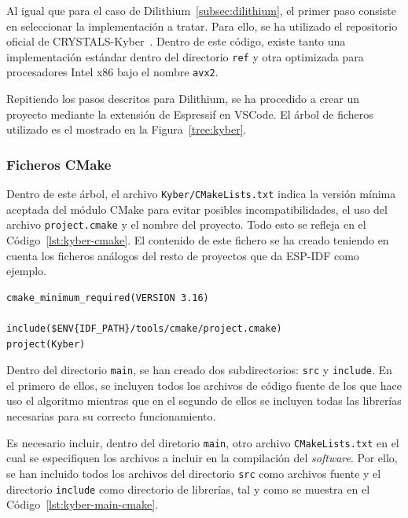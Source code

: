 Al igual que para el caso de Dilithium~\ref{subsec:dilithium}, el primer paso consiste en seleccionar la implementación a tratar.
Para ello, se ha utilizado el repositorio oficial de CRYSTALS-Kyber~\cite{github-kyber}.
Dentro de este código, existe tanto una implementación estándar dentro del directorio \texttt{ref} y otra optimizada para procesadores Intel x86 bajo el nombre \texttt{avx2}.

Repitiendo los pasos descritos para Dilithium, se ha procedido a crear un proyecto mediante la extensión de Espressif en VSCode.
El árbol de ficheros utilizado es el mostrado en la Figura~\ref{tree:kyber}.

\subsubsection{Ficheros CMake}\label{subsubsec:kyber-cmake}

Dentro de este árbol, el archivo \texttt{Kyber/CMakeLists.txt} indica la versión mínima aceptada del módulo CMake para evitar posibles incompatibilidades, el uso del archivo \texttt{project.cmake} y el nombre del proyecto.
Todo esto se refleja en el Código~\ref{lst:kyber-cmake}.
El contenido de este fichero se ha creado teniendo en cuenta los ficheros análogos del resto de proyectos que da ESP-IDF como ejemplo.

\begin{lstlisting}[label={lst:kyber-cmake},style=Bashnice,firstnumber=1,caption={Archivo \texttt{Kyber/CMakeLists.txt}.}]
cmake_minimum_required(VERSION 3.16)

include($ENV{IDF_PATH}/tools/cmake/project.cmake)
project(Kyber)
\end{lstlisting}

Dentro del directorio \texttt{main}, se han creado dos subdirectorios: \texttt{src} y \texttt{include}.
En el primero de ellos, se incluyen todos los archivos de código fuente de los que hace uso el algoritmo mientras que en el segundo de ellos se incluyen todas las librerías necesarias para su correcto funcionamiento.

Es necesario incluir, dentro del diretorio \texttt{main}, otro archivo \texttt{CMakeLists.txt} en el cual se especifiquen los archivos a incluir en la compilación del \textit{software}.
Por ello, se han incluido todos los archivos del directorio \texttt{src} como archivos fuente y el directorio \texttt{include} como directorio de librerías, tal y como se muestra en el Código~\ref{lst:kyber-main-cmake}.

